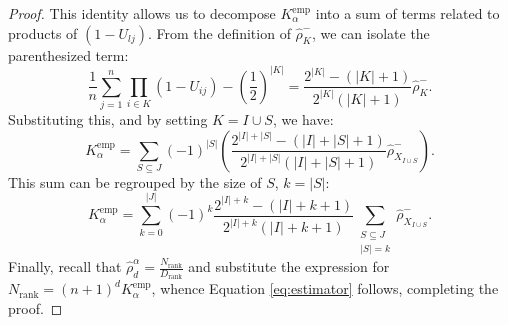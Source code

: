 \documentclass[11pt,a4paper]{article}
\begin{document}
\begin{proof}
This identity allows us to decompose $K_{\alpha}^{\text{emp}}$ into a sum of terms related to products of $(1-U_{lj})$.
From the definition of $\widehat{\rho}_K^-$, we can isolate the parenthesized term:
$$ \frac{1}{n} \sum_{j=1}^n \prod_{i \in K} (1 - U_{ij}) - \left(\frac{1}{2}\right)^{|K|} = \frac{2^{|K|}-(|K|+1)}{2^{|K|}(|K|+1)} \widehat{\rho}_K^-. $$
Substituting this, and by setting $K = I \cup S$, we have:
$$K_{\alpha}^{\text{emp}} = \sum_{S \subseteq J} (-1)^{|S|} \left( \frac{2^{|I|+|S|}-(|I|+|S|+1)}{2^{|I|+|S|}(|I|+|S|+1)} \widehat{\rho}_{X_{I\cup S}}^- \right).$$
This sum can be regrouped by the size of $S$, $k=|S|$:
$$K_{\alpha}^{\text{emp}} = \sum_{k=0}^{|J|} (-1)^k \frac{2^{|I|+k}-(|I|+k+1)}{2^{|I|+k}(|I|+k+1)} \sum_{\substack{S \subseteq J \\ |S|=k}} \widehat{\rho}_{X_{I\cup S}}^-.$$
Finally, recall that $\widehat{\rho}_d^{\alpha} = \frac{N_{\text{rank}}}{D_{\text{rank}}}$ and substitute the expression for $N_{\text{rank}} = (n+1)^d K_{\alpha}^{\text{emp}}$, whence Equation \eqref{eq:estimator} follows, completing the proof.
\end{proof}
\end{document}
